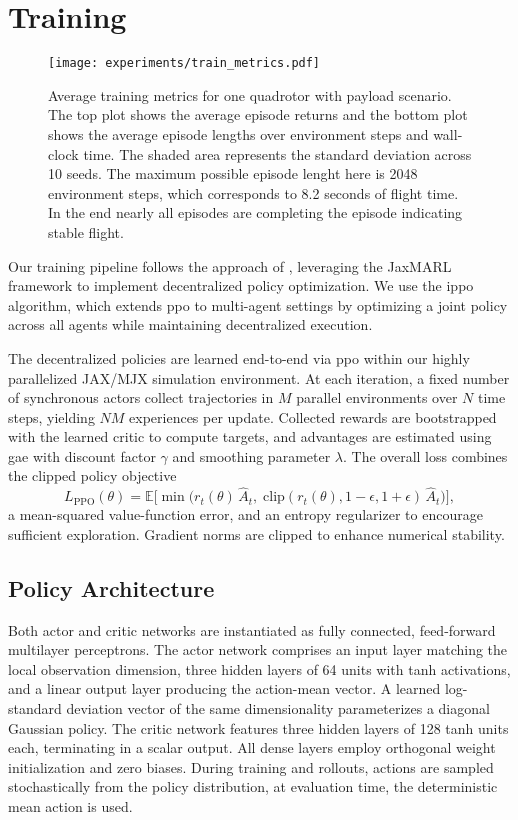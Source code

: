 \section{Training}
\begin{figure}[ht]
    \centering
    
    \texttt{[image: experiments/train\_metrics.pdf]}
    \caption[Training metrics]{Average training metrics for one quadrotor with payload scenario. The top plot shows the average episode returns and the bottom plot shows the average episode lengths over environment steps and wall-clock time. The shaded area represents the standard deviation across 10 seeds. The maximum possible episode lenght here is 2048 environment steps, which corresponds to 8.2 seconds of flight time. In the end nearly all episodes are completing the episode indicating stable flight.}
    \label{fig:train_metrics}
\end{figure}
Our training pipeline follows the approach of \autocite{flair2023jaxmarl}, leveraging the JaxMARL framework to implement decentralized policy optimization. We use the \gls{ippo} algorithm, which extends \gls{ppo} to multi-agent settings by optimizing a joint policy across all agents while maintaining decentralized execution.

The decentralized policies are learned end-to-end via \gls{ppo} within our highly parallelized JAX/MJX simulation environment. At each iteration, a fixed number of synchronous actors collect trajectories in $M$ parallel environments over $N$ time steps, yielding $NM$ experiences per update. Collected rewards are bootstrapped with the learned critic to compute targets, and advantages are estimated using \gls{gae} with discount factor $\gamma$ and smoothing parameter $\lambda$. The overall loss combines the clipped policy objective
\begin{equation}
L_{\mathrm{PPO}}(\theta) = \mathbb{E}\!\bigl[\min\bigl(r_t(\theta)\,\hat{A}_t,\;\mathrm{clip}(r_t(\theta),1-\epsilon,1+\epsilon)\,\hat{A}_t\bigr)\bigr],
\end{equation}
a mean-squared value-function error, and an entropy regularizer to encourage sufficient exploration. Gradient norms are clipped to enhance numerical stability.

\subsection{Policy Architecture}
Both actor and critic networks are instantiated as fully connected, feed-forward multilayer perceptrons. The actor network comprises an input layer matching the local observation dimension, three hidden layers of 64 units with tanh activations, and a linear output layer producing the action-mean vector. A learned log-standard deviation vector of the same dimensionality parameterizes a diagonal Gaussian policy. The critic network features three hidden layers of 128 tanh units each, terminating in a scalar output. All dense layers employ orthogonal weight initialization and zero biases. During training and rollouts, actions are sampled stochastically from the policy distribution, at evaluation time, the deterministic mean action is used.

